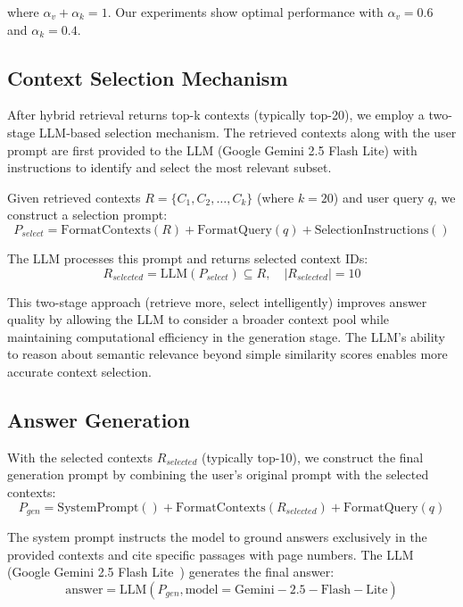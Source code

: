 \documentclass[runningheads]{llncs}
\begin{document}
where $\alpha_v + \alpha_k = 1$. Our experiments show optimal performance with $\alpha_v = 0.6$ and $\alpha_k = 0.4$.

\subsection{Context Selection Mechanism}

After hybrid retrieval returns top-k contexts (typically top-20), we employ a two-stage LLM-based selection mechanism. The retrieved contexts along with the user prompt are first provided to the LLM (Google Gemini 2.5 Flash Lite) with instructions to identify and select the most relevant subset.

Given retrieved contexts $R = \{C_1, C_2, \ldots, C_k\}$ (where $k=20$) and user query $q$, we construct a selection prompt:
\begin{equation}
P_{select} = \mathrm{FormatContexts}(R) + \mathrm{FormatQuery}(q) + \mathrm{SelectionInstructions}()
\end{equation}

The LLM processes this prompt and returns selected context IDs:
\begin{equation}
R_{selected} = \mathrm{LLM}(P_{select}) \subseteq R, \quad |R_{selected}| = 10
\end{equation}

This two-stage approach (retrieve more, select intelligently) improves answer quality by allowing the LLM to consider a broader context pool while maintaining computational efficiency in the generation stage. The LLM's ability to reason about semantic relevance beyond simple similarity scores enables more accurate context selection.

\subsection{Answer Generation}

With the selected contexts $R_{selected}$ (typically top-10), we construct the final generation prompt by combining the user's original prompt with the selected contexts:
\begin{equation}
P_{gen} = \mathrm{SystemPrompt}() + \mathrm{FormatContexts}(R_{selected}) + \mathrm{FormatQuery}(q)
\end{equation}

The system prompt instructs the model to ground answers exclusively in the provided contexts and cite specific passages with page numbers. The LLM (Google Gemini 2.5 Flash Lite~\cite{gemini2024modelcard}) generates the final answer:
\begin{equation}
\mathrm{answer} = \mathrm{LLM}(P_{gen}, \mathrm{model} = \mathrm{Gemini-2.5-Flash-Lite})
\end{equation}
\end{document}
